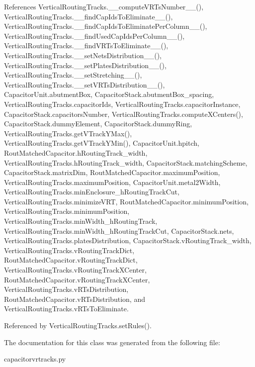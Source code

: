 References Vertical\+Routing\+Tracks.\+\_\+\+\_\+compute\+V\+R\+Ts\+Number\+\_\+\+\_\+(), Vertical\+Routing\+Tracks.\+\_\+\+\_\+find\+Cap\+Ids\+To\+Eliminate\+\_\+\+\_\+(), Vertical\+Routing\+Tracks.\+\_\+\+\_\+find\+Cap\+Ids\+To\+Eliminate\+Per\+Column\+\_\+\+\_\+(), Vertical\+Routing\+Tracks.\+\_\+\+\_\+find\+Used\+Cap\+Ids\+Per\+Column\+\_\+\+\_\+(), Vertical\+Routing\+Tracks.\+\_\+\+\_\+find\+V\+R\+Ts\+To\+Eliminate\+\_\+\+\_\+(), Vertical\+Routing\+Tracks.\+\_\+\+\_\+set\+Nets\+Distribution\+\_\+\+\_\+(), Vertical\+Routing\+Tracks.\+\_\+\+\_\+set\+Plates\+Distribution\+\_\+\+\_\+(), Vertical\+Routing\+Tracks.\+\_\+\+\_\+set\+Stretching\+\_\+\+\_\+(), Vertical\+Routing\+Tracks.\+\_\+\+\_\+set\+V\+R\+Ts\+Distribution\+\_\+\+\_\+(), Capacitor\+Unit.\+abutment\+Box, Capacitor\+Stack.\+abutment\+Box\+\_\+spacing, Vertical\+Routing\+Tracks.\+capacitor\+Ids, Vertical\+Routing\+Tracks.\+capacitor\+Instance, Capacitor\+Stack.\+capacitors\+Number, Vertical\+Routing\+Tracks.\+compute\+X\+Centers(), Capacitor\+Stack.\+dummy\+Element, Capacitor\+Stack.\+dummy\+Ring, Vertical\+Routing\+Tracks.\+get\+V\+Track\+Y\+Max(), Vertical\+Routing\+Tracks.\+get\+V\+Track\+Y\+Min(), Capacitor\+Unit.\+hpitch, Rout\+Matched\+Capacitor.\+h\+Routing\+Track\+\_\+width, Vertical\+Routing\+Tracks.\+h\+Routing\+Track\+\_\+width, Capacitor\+Stack.\+matching\+Scheme, Capacitor\+Stack.\+matrix\+Dim, Rout\+Matched\+Capacitor.\+maximum\+Position, Vertical\+Routing\+Tracks.\+maximum\+Position, Capacitor\+Unit.\+metal2\+Width, Vertical\+Routing\+Tracks.\+min\+Enclosure\+\_\+h\+Routing\+Track\+Cut, Vertical\+Routing\+Tracks.\+minimize\+V\+RT, Rout\+Matched\+Capacitor.\+minimum\+Position, Vertical\+Routing\+Tracks.\+minimum\+Position, Vertical\+Routing\+Tracks.\+min\+Width\+\_\+h\+Routing\+Track, Vertical\+Routing\+Tracks.\+min\+Width\+\_\+h\+Routing\+Track\+Cut, Capacitor\+Stack.\+nets, Vertical\+Routing\+Tracks.\+plates\+Distribution, Capacitor\+Stack.\+v\+Routing\+Track\+\_\+width, Vertical\+Routing\+Tracks.\+v\+Routing\+Track\+Dict, Rout\+Matched\+Capacitor.\+v\+Routing\+Track\+Dict, Vertical\+Routing\+Tracks.\+v\+Routing\+Track\+X\+Center, Rout\+Matched\+Capacitor.\+v\+Routing\+Track\+X\+Center, Vertical\+Routing\+Tracks.\+v\+R\+Ts\+Distribution, Rout\+Matched\+Capacitor.\+v\+R\+Ts\+Distribution, and Vertical\+Routing\+Tracks.\+v\+R\+Ts\+To\+Eliminate.



Referenced by Vertical\+Routing\+Tracks.\+set\+Rules().



The documentation for this class was generated from the following file\+:\begin{DoxyCompactItemize}
\item 
capacitorvrtracks.\+py\end{DoxyCompactItemize}
